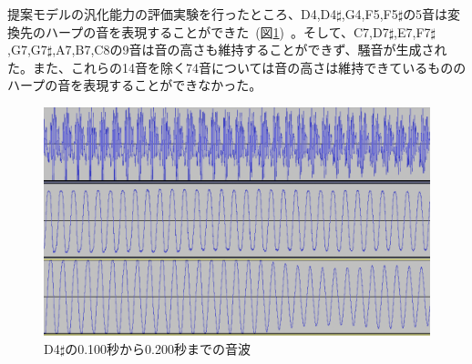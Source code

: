 提案モデルの汎化能力の評価実験を行ったところ、D4,D4$\sharp$,G4,F5,F5$\sharp$の5音は変換先のハープの音を表現することができた~(図\ref{fig:66_22_near})~。そして、C7,D7$\sharp$,E7,F7$\sharp$,G7,G7$\sharp$,A7,B7,C8の9音は音の高さも維持することができず、騒音が生成された。また、これらの14音を除く74音については音の高さは維持できているもののハープの音を表現することができなかった。

\begin{figure}[b]
\begin{center}
\includegraphics[width=0.7\hsize]{figure/66_22_det/d4s_0100_0200.png}
\caption{D4$\sharp$の0.100秒から0.200秒までの音波}
\label{fig:66_22_near}
\end{center}
\end{figure}


